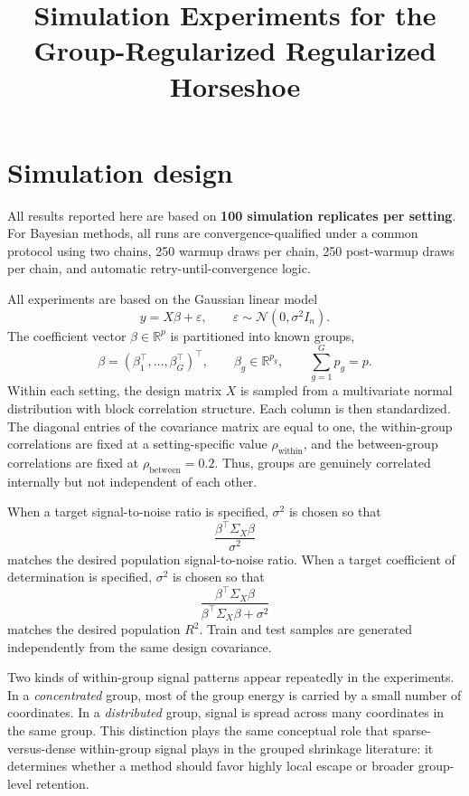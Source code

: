 \documentclass[11pt]{article}
\title{Simulation Experiments for the Group-Regularized Regularized Horseshoe}
\author{}
\date{}
\newcommand{\R}{\mathbb{R}}
\newcommand{\Norm}{\mathcal{N}}
\begin{document}
\maketitle

\section{Simulation design}

All results reported here are based on \textbf{100 simulation replicates per
setting}. For Bayesian methods, all runs are convergence-qualified under a
common protocol using two chains, 250 warmup draws per chain, 250
post-warmup draws per chain, and automatic retry-until-convergence logic.

All experiments are based on the Gaussian linear model
\[
  y = X\beta + \varepsilon,
  \qquad
  \varepsilon \sim \Norm(0,\sigma^2 I_n).
\]
The coefficient vector \(\beta\in\R^p\) is partitioned into known groups,
\[
  \beta = (\beta_1^\top,\dots,\beta_G^\top)^\top,
  \qquad
  \beta_g \in \R^{p_g},
  \qquad
  \sum_{g=1}^G p_g = p.
\]
Within each setting, the design matrix \(X\) is sampled from a multivariate
normal distribution with block correlation structure. Each column is then
standardized. The diagonal entries of the covariance matrix are equal to one,
the within-group correlations are fixed at a setting-specific value
\(\rho_{\mathrm{within}}\), and the between-group correlations are fixed at
\(\rho_{\mathrm{between}}=0.2\). Thus, groups are genuinely correlated
internally but not independent of each other.

When a target signal-to-noise ratio is specified, \(\sigma^2\) is chosen so
that
\[
  \frac{\beta^\top \Sigma_X \beta}{\sigma^2}
\]
matches the desired population signal-to-noise ratio. When a target
coefficient of determination is specified, \(\sigma^2\) is chosen so that
\[
  \frac{\beta^\top \Sigma_X \beta}{\beta^\top \Sigma_X \beta + \sigma^2}
\]
matches the desired population \(R^2\). Train and test samples are generated
independently from the same design covariance.

Two kinds of within-group signal patterns appear repeatedly in the experiments.
In a \emph{concentrated} group, most of the group energy is carried by a small
number of coordinates. In a \emph{distributed} group, signal is spread across
many coordinates in the same group. This distinction plays the same conceptual
role that sparse-versus-dense within-group signal plays in the grouped
shrinkage literature: it determines whether a method should favor highly local
escape or broader group-level retention.
\end{document}
